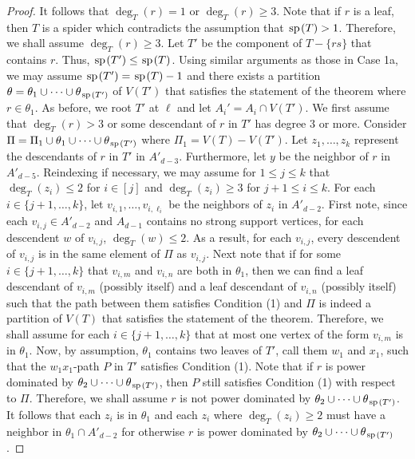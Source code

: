 \documentclass[11pt]{article}
\newcommand{\spider}{\hskip1pt \textrm{sp} \hskip1pt}
\begin{document}
\begin{proof}
It follows that $\deg_T(r) = 1$ or $\deg_T(r) \ge 3$. Note that if $r$ is a leaf, then $T$ is a spider which contradicts the assumption that $\spider(T)>1$. Therefore, we shall assume $\deg_T(r) \ge 3$. Let $T'$ be the component of $T- \{rs\}$ that contains $r$. Thus, $\spider(T') \le \spider(T)$. Using similar arguments as those in Case 1a, we may assume $\spider(T') = \spider(T)-1$ and there exists a partition $\theta = \theta_1 \cup \cdots \cup \theta_{\spider(T')}$ of $V(T')$ that satisfies the statement of the theorem where $r \in \theta_1$. As before, we root $T'$ at $\ell$ and let $A_i' = A_i \cap V(T')$. We first assume that $\deg_T(r) >3$ or some descendant of $r$ in $T'$ has degree $3$ or more. Consider $\Pi  = \Pi_1 \cup \theta_1\cup \cdots \cup \theta_{\spider(T')}$ where $\Pi_1 = V(T) - V(T')$. Let $z_1, \dots, z_k$ represent the descendants of $r$ in $T'$ in $A'_{d-3}$. Furthermore, let $y$ be the neighbor of $r$ in $A'_{d-5}$. Reindexing if necessary, we may assume for $1 \le j \le k$ that $\deg_T(z_i) \le 2$ for $i \in [j]$ and $\deg_T(z_i) \ge 3$ for $j+1 \le i \le k$. For each $i \in \{j+1, \dots, k\}$,  let $v_{i,1}, \dots, v_{i,\ell_i}$ be the neighbors of $z_i$ in $A'_{d-2}$. First note, since each $v_{i,j} \in A'_{d-2}$ and $A_{d-1}$ contains no strong support vertices, for each descendent $w$ of $v_{i,j}$, $\deg_T(w)\le 2$.  As a result, for each $v_{i,j}$, every descendent of $v_{i,j}$ is in the same element of $\Pi$ as $v_{i,j}$. Next note that if for some $i \in \{j+1, \dots, k\}$ that $v_{i,m}$ and $v_{i,n}$ are both in $\theta_1$, then we can find a leaf descendant of $v_{i,m}$ (possibly itself) and a leaf descendant of $v_{i,n}$ (possibly itself) such that the path between them satisfies Condition (1)  and $\Pi$ is indeed a partition of $V(T)$ that satisfies the statement of the theorem. Therefore, we shall assume for each $i \in \{j+1, \dots, k\}$ that at most one vertex of the form $v_{i,m}$ is in $\theta_1$. Now, by assumption, $\theta_1$ contains two leaves of $T'$, call them $w_1$ and $x_1$, such that the $w_1x_1$-path $P$ in $T'$ satisfies Condition (1). Note that if $r$ is power dominated by $\theta_2 \cup \cdots \cup \theta_{\spider(T')}$, then $P$ still satisfies Condition (1) with respect to $\Pi$. Therefore, we shall assume $r$ is not power dominated by $\theta_2 \cup \cdots \cup \theta_{\spider(T')}$. It follows that each $z_i$ is in $\theta_1$ and each $z_i$ where $\deg_T(z_i) \ge 2$ must have a neighbor in $\theta_1 \cap A'_{d-2}$ for otherwise $r$ is power dominated by $\theta_2 \cup \cdots \cup \theta_{\spider(T')}$. 


\end{proof}
\end{document}
